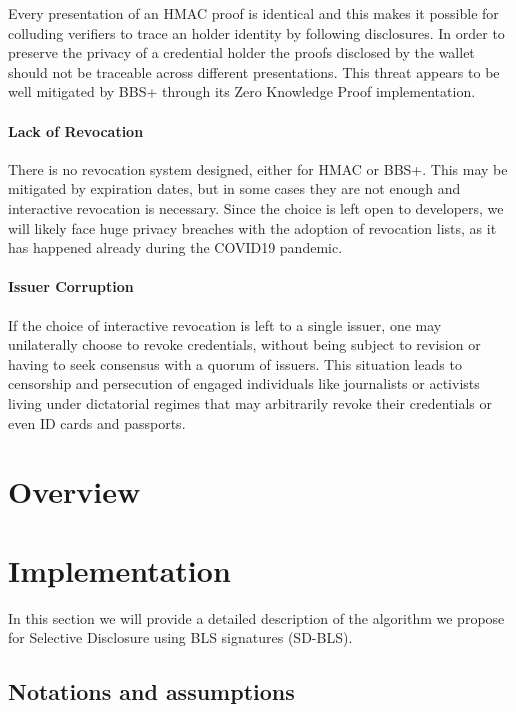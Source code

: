 \documentclass[conference]{IEEEtran}
\begin{document}
Every presentation of an HMAC proof is identical and this makes it possible for colluding verifiers to trace an holder identity by following disclosures. In order to preserve the privacy of a credential holder the proofs disclosed by the wallet should not be traceable across different presentations. This threat appears to be well mitigated by BBS+ through its Zero Knowledge Proof implementation.

\paragraph{Lack of Revocation}

There is no revocation system designed, either for HMAC or BBS+. This may be mitigated by expiration dates, but in some cases they are not enough and interactive revocation is necessary. Since the choice is left open to developers, we will likely face huge privacy breaches with the adoption of revocation lists, as it has happened already during the COVID19 pandemic.



\paragraph{Issuer Corruption}

If the choice of interactive revocation is left to a single issuer, one may unilaterally choose to revoke credentials, without being subject to revision or having to seek consensus with a quorum of issuers. This situation leads to censorship and persecution of engaged individuals like journalists or activists living under dictatorial regimes that may arbitrarily revoke their credentials or even ID cards and passports.

\section{Overview}


\section{Implementation}

In this section we will provide a detailed description of the algorithm we propose for Selective Disclosure using BLS signatures (SD-BLS).

\subsection{Notations and assumptions}
\end{document}
